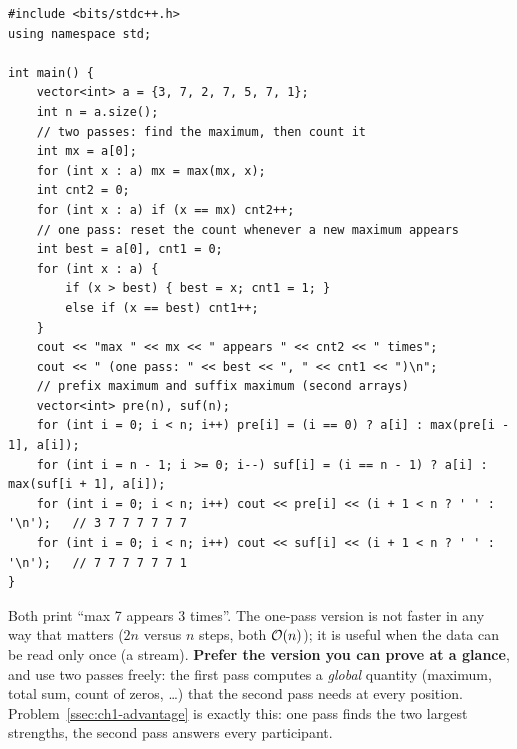 \begin{lstlisting}[style=cpp]
#include <bits/stdc++.h>
using namespace std;

int main() {
    vector<int> a = {3, 7, 2, 7, 5, 7, 1};
    int n = a.size();
    // two passes: find the maximum, then count it
    int mx = a[0];
    for (int x : a) mx = max(mx, x);
    int cnt2 = 0;
    for (int x : a) if (x == mx) cnt2++;
    // one pass: reset the count whenever a new maximum appears
    int best = a[0], cnt1 = 0;
    for (int x : a) {
        if (x > best) { best = x; cnt1 = 1; }
        else if (x == best) cnt1++;
    }
    cout << "max " << mx << " appears " << cnt2 << " times";
    cout << " (one pass: " << best << ", " << cnt1 << ")\n";
    // prefix maximum and suffix maximum (second arrays)
    vector<int> pre(n), suf(n);
    for (int i = 0; i < n; i++) pre[i] = (i == 0) ? a[i] : max(pre[i - 1], a[i]);
    for (int i = n - 1; i >= 0; i--) suf[i] = (i == n - 1) ? a[i] : max(suf[i + 1], a[i]);
    for (int i = 0; i < n; i++) cout << pre[i] << (i + 1 < n ? ' ' : '\n');   // 3 7 7 7 7 7 7
    for (int i = 0; i < n; i++) cout << suf[i] << (i + 1 < n ? ' ' : '\n');   // 7 7 7 7 7 7 1
}
\end{lstlisting}

Both print ``max 7 appears 3 times''. The one-pass version is not faster in any way that matters ($2n$ versus $n$ steps, both $\mathcal{O}(n)$); it is useful when the data can be read only once (a stream). \textbf{Prefer the version you can prove at a glance}, and use two passes freely: the first pass computes a \emph{global} quantity (maximum, total sum, count of zeros, \ldots) that the second pass needs at every position. Problem~\ref{ssec:ch1-advantage} is exactly this: one pass finds the two largest strengths, the second pass answers every participant.

\begin{diagrambox}
\end{diagrambox}

